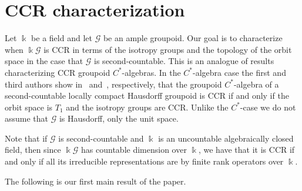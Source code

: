 \documentclass[11pt,reqno]{amsart}
\theoremstyle{plain}
\numberwithin{equation}{section}
\newcommand{\G}[0]{\mathscr{G}}
\newcommand{\cG}[0]{\mathbb{C}\mathscr{G}}
\begin{document}
\section{CCR characterization}\label{sec:CCRcharacterization}
Let $\Bbbk$ be a field and let $\mathscr G$ be an ample groupoid. %
 Our goal is to characterize when $\Bbbk \G$ is CCR in terms of the isotropy groups and the topology of the orbit space in the case that $\mathscr G$ is second-countable.  %
 This is an analogue of results characterizing CCR groupoid $C^*$-algebras. In the $C^*$-algebra case the first and third authors show in~\cite[Theorem 6.1]{Cl07} and~\cite[Theorem 3.6]{vW18a}, respectively, that the groupoid $C^*$-algebra of a second-countable locally compact Hausdorff groupoid is CCR if and only if the orbit space is $T_1$ and the isotropy groups are CCR. Unlike the $C^*$-case we do not assume that $\mathscr G$ is Hausdorff, only the unit space.

Note that if $\mathscr G$ is second-countable and $\Bbbk$ is an uncountable algebraically closed field, then since $\Bbbk \mathscr G$ has countable dimension over $\Bbbk$, we have that it is CCR if and only if all its irreducible representations are by finite rank operators over $\Bbbk$.




The following is our first main result of the paper.
\end{document}

